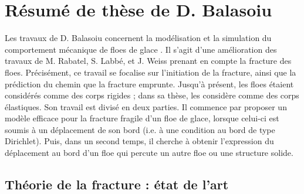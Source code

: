 \section{Résumé de thèse de D. Balasoiu}

Les travaux de D. Balasoiu concernent la modélisation et la simulation du comportement mécanique de floes de glace \parencite{balasoiu2020halthesis}. Il s'agit d'une amélioration des travaux de M. Rabatel, S. Labbé, et J. Weiss \parencite{rabatel2015thesis,rabatel2015dynamics} prenant en compte la fracture des floes. Précisément, ce travail se focalise sur l’initiation de la fracture, ainsi que la prédiction du chemin que la fracture emprunte. Jusqu’à présent, les floes étaient considérés comme des corps rigides ; dans sa thèse, \citeauthor{balasoiu2020halthesis} les considère comme des corps élastiques. Son travail est divisé en deux parties. Il commence par proposer un modèle efficace pour la fracture fragile d’un floe de glace, lorsque celui-ci est soumis à un déplacement de son bord (i.e. à une condition au bord de type Dirichlet). Puis, dans un second temps, il cherche à obtenir l’expression du déplacement au bord d’un floe qui percute un autre floe ou une structure solide.

\subsection{Théorie de la fracture : état de l’art} 
 
